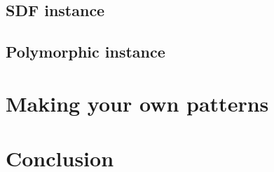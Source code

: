 \documentclass{article}
\begin{document}
\subsection{SDF instance}
\label{sec:sdf-instance}


\subsection{Polymorphic instance}
\label{sec:poly-instance}


\section{Making your own patterns}
\label{sec:making-your-own}


\section{Conclusion}
\label{sec:conclusion}




\end{document}
